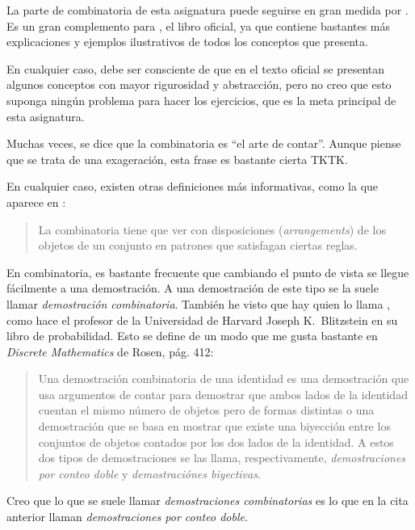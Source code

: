 



La parte de combinatoria de esta asignatura puede seguirse en gran medida
por \cite{brualdi}. Es un gran complemento para \cite{bujalance-costa}, el
libro oficial, ya que contiene bastantes más explicaciones y ejemplos
ilustrativos de todos los conceptos que presenta.

En cualquier caso, debe ser consciente de que en el texto oficial se
presentan algunos conceptos con mayor rigurosidad y abstracción, pero no
creo que esto suponga ningún problema para hacer los ejercicios, que es la
meta principal de esta asignatura.

Muchas veces, se dice que la combinatoria es ``el arte de contar''. Aunque
piense que se trata de una exageración, esta frase es bastante cierta TKTK.

En cualquier caso, existen otras definiciones más informativas, como la que
aparece en \cite{brualdi}:

\begin{quote}
  La combinatoria tiene que ver con disposiciones (\emph{arrangements}) de
  los objetos de un conjunto en patrones que satisfagan ciertas reglas.
\end{quote}








En combinatoria, es bastante frecuente que cambiando el punto de vista se
llegue fácilmente a una demostración. A una demostración de este tipo se la
suele llamar \emph{demostración combinatoria}. También he visto que hay quien
lo llama , como hace el profesor de la Universidad de
Harvard Joseph K.~Blitzstein en su libro de probabilidad. Esto se define de
un modo que me gusta bastante en \emph{Discrete Mathematics} de Rosen, pág.
412:

\begin{quote}
  Una demostración combinatoria de una identidad es una demostración que usa
  argumentos de contar para demostrar que ambos lados de la identidad
  cuentan el mismo número de objetos pero de formas distintas o una
  demostración que se basa en mostrar que existe una biyección entre los
  conjuntos de objetos contados por los dos lados de la identidad. A estos
  dos tipos de demostraciones se las llama, respectivamente,
  \emph{demostraciones por conteo doble} y \emph{demostraciónes biyectivas}.
\end{quote}

\noindent Creo que lo que se suele llamar \emph{demostraciones combinatorias}
es lo que en la cita anterior llaman \emph{demostraciones por conteo doble}.

